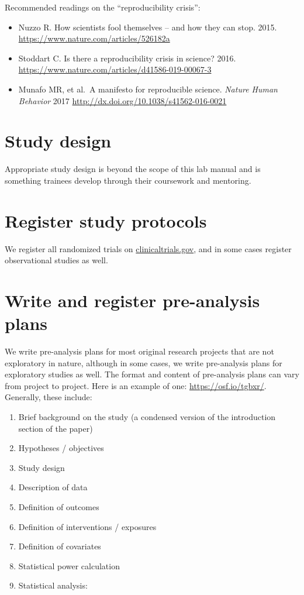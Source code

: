 \documentclass[
]{book}
\providecommand{\tightlist}{%
  \setlength{\itemsep}{0pt}\setlength{\parskip}{0pt}}
\begin{document}
Recommended readings on the ``reproducibility crisis'':

\begin{itemize}
\item
  Nuzzo R. How scientists fool themselves -- and how they can stop. 2015. \href{}{https://www.nature.com/articles/526182a}
\item
  Stoddart C. Is there a reproducibility crisis in science? 2016. \url{https://www.nature.com/articles/d41586-019-00067-3}
\item
  Munafo MR, et al.~A manifesto for reproducible science. \emph{Nature Human Behavior} 2017 \url{http://dx.doi.org/10.1038/s41562-016-0021}
\end{itemize}

\section{Study design}\label{study-design}

Appropriate study design is beyond the scope of this lab manual and is something trainees develop through their coursework and mentoring.

\section{Register study protocols}\label{register-study-protocols}

We register all randomized trials on \url{clinicaltrials.gov}, and in some cases register observational studies as well.

\section{Write and register pre-analysis plans}\label{write-and-register-pre-analysis-plans}

We write pre-analysis plans for most original research projects that are not exploratory in nature, although in some cases, we write pre-analysis plans for exploratory studies as well. The format and content of pre-analysis plans can vary from project to project. Here is an example of one: \url{https://osf.io/tgbxr/}. Generally, these include:

\begin{enumerate}
\def\labelenumi{\arabic{enumi}.}
\tightlist
\item
  Brief background on the study (a condensed version of the introduction section of the paper)
\item
  Hypotheses / objectives
\item
  Study design
\item
  Description of data
\item
  Definition of outcomes
\item
  Definition of interventions / exposures
\item
  Definition of covariates
\item
  Statistical power calculation
\item
  Statistical analysis:
\end{enumerate}
\end{document}
